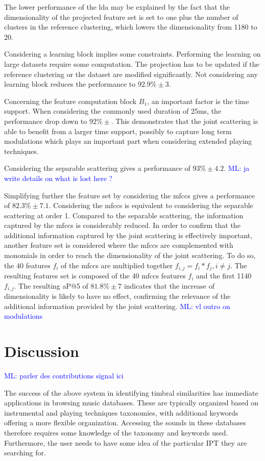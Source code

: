 \documentclass{bmcart}
\newcommand{\ml}[1]{\textcolor{blue}{ML: #1}}
\begin{document}
The lower performance of the lda may be explained by the fact that the dimensionality of the projected feature set is set to one plus the number of clusters in the reference clustering, which lowers the dimensionality from 1180 to 20.

Considering a learning block implies some constraints. Performing the learning on large datasets require some computation. The projection has to be updated if the reference clustering or the dataset are modified significantly. Not considering any learning block reduces the performance to $92.9\% \pm 3$.

Concerning the feature computation block $B_1$, an important factor is the time support. When considering the commonly used duration of 25ms, the performance drop down to $92\% \pm$. This demonstrates that the joint scattering is able to benefit from a larger time support, possibly to capture long term modulations which plays an important part when considering extended playing techniques.

Considering the separable scattering gives a performance of $93\% \pm 4.2$. \ml{ ja write details on what is lost here ?}

Simplifying further the feature set by considering the mfccs gives a performance of $82.3\% \pm 7.1$. Considering the mfccs is equivalent to considering the separable scattering at order 1. Compared to the separable scattering, the information captured by the mfccs is considerably reduced. In order to confirm that the additional information captured by the joint scattering is effectively important, another feature set is considered where the mfccs are complemented with monomials in order to reach the dimensionality of the joint scattering. To do so, the 40 features $f_i$ of the mfccs are multiplied together $f_{i, j} = f_i*f_j, i \neq j$. The resulting features set is composed of the 40 mfccs features $f_i$ and the first 1140 $f_{i, j}$. The resulting aP@5 of $81.8\% \pm 7$ indicates that the increase of dimensionality is likely to have no effect, confirming the relevance of the additional information provided by the joint scattering. \ml{vl outro on modulations}

\section*{Discussion}
\label{sec:discussion}

\ml{ parler des contributions signal ici}

The success of the above system in identifying timbral similarities has immediate applications in browsing music databases.
These are typically organized based on instrumental and playing techniques taxonomies, with additional keywords offering a more flexible organization.
Accessing the sounds in these databases therefore requires some knowledge of the taxonomy and keywords used.
Furthermore, the user needs to have some idea of the particular IPT they are searching for.
\end{document}
